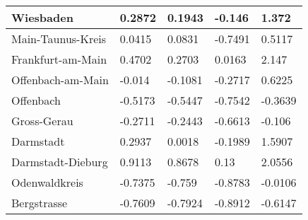 \begin{table}
\begin{tabular}{|l||x{2cm}|x{2cm}|x{2cm}|x{2cm}|}
		Wiesbaden & 0.2872 & 0.1943 & -0.146 & 1.372 \\ \hline
		Main-Taunus-Kreis & 0.0415 & 0.0831 & -0.7491 & 0.5117 \\ \hline
		Frankfurt-am-Main & 0.4702 & 0.2703 & 0.0163 & 2.147 \\ \hline
		Offenbach-am-Main & -0.014 & -0.1081 & -0.2717 & 0.6225 \\ \hline
		Offenbach & -0.5173 & -0.5447 & -0.7542 & -0.3639 \\ \hline
		Gross-Gerau & -0.2711 & -0.2443 & -0.6613 & -0.106 \\ \hline
		Darmstadt & 0.2937 & 0.0018 & -0.1989 & 1.5907 \\ \hline
		Darmstadt-Dieburg & 0.9113 & 0.8678 & 0.13 & 2.0556 \\ \hline
		Odenwaldkreis & -0.7375 & -0.759 & -0.8783 & -0.0106 \\ \hline
		Bergstrasse & -0.7609 & -0.7924 & -0.8912 & -0.6147 \\ \hline
	\end{tabular}
	\label{tab:76_perc_dev}
\end{table}


																									
